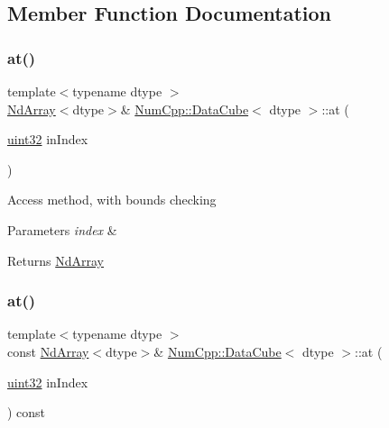 \subsection{Member Function Documentation}
\mbox{\label{class_num_cpp_1_1_data_cube_ac4ba93c6bff1a954b8ab73b2b671fc82}} 
\subsubsection{\texorpdfstring{at()}{at()}\hspace{0.1cm}{\footnotesize\ttfamily [1/2]}}
{\footnotesize\ttfamily template$<$typename dtype $>$ \\
\mbox{\hyperlink{class_num_cpp_1_1_nd_array}{Nd\+Array}}$<$dtype$>$\& \mbox{\hyperlink{class_num_cpp_1_1_data_cube}{Num\+Cpp\+::\+Data\+Cube}}$<$ dtype $>$\+::at (\begin{DoxyParamCaption}\item[{\mbox{\hyperlink{namespace_num_cpp_a36f388e948380413c63011cab9b7fbd5}{uint32}}}]{in\+Index }\end{DoxyParamCaption})\hspace{0.3cm}{\ttfamily [inline]}}

Access method, with bounds checking


\begin{DoxyParams}{Parameters}
{\em index} & \\
\hline
\end{DoxyParams}
\begin{DoxyReturn}{Returns}
\mbox{\hyperlink{class_num_cpp_1_1_nd_array}{Nd\+Array}} 
\end{DoxyReturn}
\mbox{\label{class_num_cpp_1_1_data_cube_a4671cf664bf22da2397a60eed58441c2}} 
\subsubsection{\texorpdfstring{at()}{at()}\hspace{0.1cm}{\footnotesize\ttfamily [2/2]}}
{\footnotesize\ttfamily template$<$typename dtype $>$ \\
const \mbox{\hyperlink{class_num_cpp_1_1_nd_array}{Nd\+Array}}$<$dtype$>$\& \mbox{\hyperlink{class_num_cpp_1_1_data_cube}{Num\+Cpp\+::\+Data\+Cube}}$<$ dtype $>$\+::at (\begin{DoxyParamCaption}\item[{\mbox{\hyperlink{namespace_num_cpp_a36f388e948380413c63011cab9b7fbd5}{uint32}}}]{in\+Index }\end{DoxyParamCaption}) const\hspace{0.3cm}{\ttfamily [inline]}}

